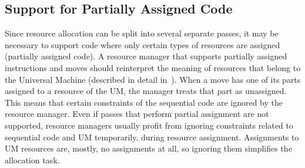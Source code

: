 \documentclass[a4paper,twoside]{tce}
\begin{document}
\subsection{Support for Partially Assigned Code}

Since resource allocation can be split into several separate passes, it may
be necessary to support code where only certain types of resources are
assigned (partially assigned code). A resource manager that supports
partially assigned instructions and moves should reinterpret the meaning of
resources that belong to the Universal Machine (described in detail
in~\cite{TCE-progTemplate}). When a move has one of its parts assigned to a
resource of the UM, the manager treats that part as unassigned. This means
that certain constraints of the sequential code are ignored by the resource
manager.
%
Even if passes that perform partial assignment are not supported, resource
managers usually profit from ignoring constraints related to sequential
code and UM temporarily, during resource assignment. Assignments to UM
resources are, mostly, no assignments at all, so ignoring them simplifies
the allocation task.
\end{document}
